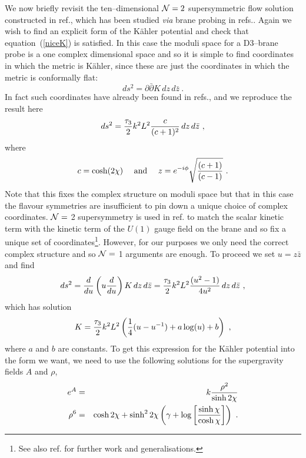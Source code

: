 \documentclass[a4paper,12pt]{article}
\begin{document}
We now briefly revisit the ten--dimensional ${\cal N} = 2$
supersymmetric flow solution constructed in ref.\cite{pw1}, which has
been studied {\it via} brane probing in refs.\cite{bpp,ejp,beh}. Again
we wish to find an explicit form of the K\"ahler potential and check
that equation~(\ref{niceK}) is satisfied.  In this case the moduli
space for a D3--brane probe is a one complex dimensional space and so
it is simple to find coordinates in which the metric is K\"ahler,
since these are just the coordinates in which the metric is
conformally flat:
\begin{equation}
 ds^2 = \partial \bar{\partial} K \, dz \, d\bar{z}\ .
\end{equation}
In fact such coordinates have already been found in
refs.\cite{bpp,ejp}, and we reproduce the result here
\begin{equation}
  ds^2 = {\tau_3 \over 2} k^2 L^2 {c \over (c+1)^2} \, dz \, d\bar{z}\ ,
\end{equation}
where
\begin{equation}
c = \cosh(2\chi)\quad \mbox{ and  }\quad 
 z = e^{-i \phi} \sqrt{{(c+1) \over (c-1)}}\ .
\end{equation}
Note that this fixes the complex structure on moduli space but that in
this case the flavour symmetries are insufficient to pin down a unique
choice of complex coordinates. $\cal{N} =$ 2 supersymmetry is used in
ref.\cite{bpp} to match the scalar kinetic term with the kinetic term
of the $U(1)$ gauge field on the brane and so fix a unique set of
coordinates\footnote{See also ref.\cite{beh} for further work and
  generalisations.}.  However, for our purposes we only need the
correct complex structure and so $\cal{N} = $ 1 arguments are enough.
To proceed we set $u = z \bar{z}$ and find
\begin{eqnarray}
 ds^2 = {d \over du} \left( u {d \over du} \right) K \, dz \, d\bar{z} 
      = {\tau_3 \over 2} k^2 L^2 {(u^2 - 1) \over 4 u^2} \, dz \, d\bar{z}\ ,
\end{eqnarray}
which has solution 
\begin{equation}
 K = {\tau_3 \over 2} 
k^2 L^2 \left({1 \over 4} (u - u^{-1}) + a \log(u) + b \right)\ ,
\end{equation}
where $a$ and $b$ are constants. To get this expression for the K\"ahler
potential into the form we want, we need to use the following
solutions\cite{pw1} for the supergravity fields $A$ and $\rho$,
\begin{eqnarray}
  e^A &=& k { \rho^2 \over \sinh2\chi } \nonumber\\
  \rho^6 &=& \cosh 2\chi + \sinh^22\chi 
\left( \gamma + \log \left[{ \sinh\chi \over \cosh \chi } \right] \right)\ .
\end{eqnarray}
\end{document}
